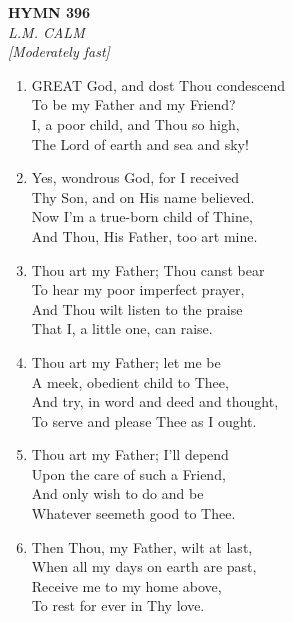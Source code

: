 \documentclass[11pt,a4paper]{article}
\begin{document}
\newpage
\begin{center}
    {\Large \textbf{HYMN 396}}
    \\
    \textit{L.M. CALM}
    \\
    \textit{\small [Moderately fast]}
\end{center}
\vspace{1em}

\begin{enumerate}
    \item GREAT God, and dost Thou condescend \\
        To be my Father and my Friend? \\
        I, a poor child, and Thou so high, \\
        The Lord of earth and sea and sky!

    \item Yes, wondrous God, for I received \\
        Thy Son, and on His name believed. \\
        Now I'm a true-born child of Thine, \\
        And Thou, His Father, too art mine.

    \item Thou art my Father; Thou canst bear \\
        To hear my poor imperfect prayer, \\
        And Thou wilt listen to the praise \\
        That I, a little one, can raise.

    \item Thou art my Father; let me be \\
        A meek, obedient child to Thee, \\
        And try, in word and deed and thought, \\
        To serve and please Thee as I ought.

    \item Thou art my Father; I'll depend \\
        Upon the care of such a Friend, \\
        And only wish to do and be \\
        Whatever seemeth good to Thee.

    \item Then Thou, my Father, wilt at last, \\
        When all my days on earth are past, \\
        Receive me to my home above, \\
        To rest for ever in Thy love.

\end{enumerate}
\end{document}
